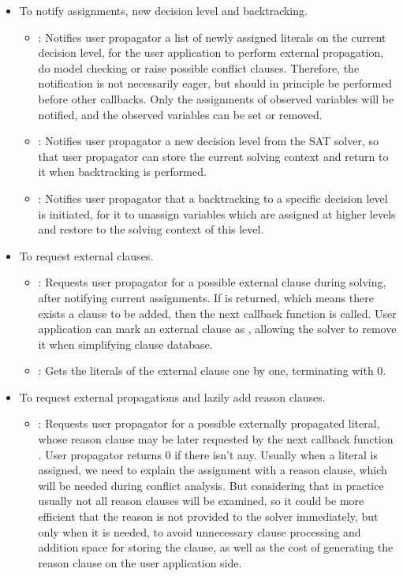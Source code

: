 \begin{itemize}
  \item To notify assignments, new decision level and backtracking.
    \begin{itemize}
      \item {}: Notifies user propagator a list of newly assigned literals on the current decision level, for the user application to perform external propagation, do model checking or raise possible conflict clauses. Therefore, the notification is not necessarily eager, but should in principle be performed before other callbacks. Only the assignments of observed variables will be notified, and the observed variables can be set or removed.
      \item {}: Notifies user propagator a new decision level from the SAT solver, so that user propagator can store the current solving context and return to it when backtracking is performed.
      \item {}: Notifies user propagator that a backtracking to a specific decision level is initiated, for it to unassign variables which are assigned at higher levels and restore to the solving context of this level.
    \end{itemize}
  \item To request external clauses.
    \begin{itemize}
      \item {}: Requests user propagator for a possible external clause during solving, after notifying current assignments. If  is returned, which means there exists a clause to be added, then the next callback function  is called. User application can mark an external clause as , allowing the solver to remove it when simplifying clause database.
      \item {}: Gets the literals of the external clause one by one, terminating with 0.  
    \end{itemize}
  \item To request external propagations and lazily add reason clauses.
    \begin{itemize}
      \item {}: Requests user propagator for a possible externally propagated literal, whose reason clause may be later requested by the next callback function . User propagator returns 0 if there isn't any. Usually when a literal is assigned, we need to explain the assignment with a reason clause, which will be needed during conflict analysis. But considering that in practice usually not all reason clauses will be examined, so it could be more efficient that the reason is not provided to the solver immediately, but only when it is needed, to avoid unnecessary clause processing and addition space for storing the clause, as well as the cost of generating the reason clause on the user application side.

\end{itemize}
\end{itemize}
